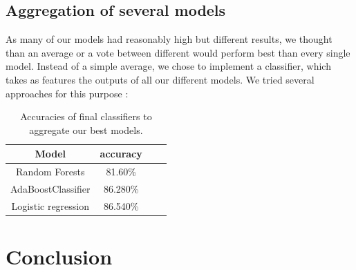 \documentclass[10pt,conference,compsocconf,retainorgcmds]{IEEEtran}
\begin{document}
\subsection{Aggregation of several models}

As many of our models had reasonably high but different results, we thought than an average or a vote between different would perform best than every single model. Instead of a simple average, we chose to implement a classifier, which takes as features the outputs of all our different models. We tried several approaches for this purpose : 
\begin{table}[h]
\begin{center}
\begin{tabular}{|c|c|c|c|}
\hline
Model & accuracy \\
\hline
Random Forests & 81.60\% \\
\hline
AdaBoostClassifier & 86.280\% \\
\hline
Logistic regression & 86.540\% \\
\hline

\end{tabular}
\label{classifier}
\caption{Accuracies of final classifiers to aggregate our best models.}
\end{center}
\end{table}


\section{Conclusion}
\end{document}
